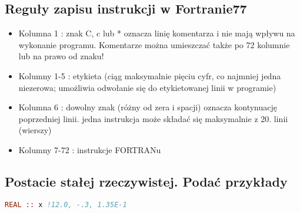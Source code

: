 \subsection{Reguły zapisu instrukcji w Fortranie77}
\begin{itemize}
\item Kolumna 1 : znak C, c lub * oznacza linię komentarza i nie mają
wpływu na wykonanie programu. Komentarze można
umieszczać także po 72 kolumnie lub na prawo od znaku!
\item Kolumny 1-5 : etykieta (ciąg maksymalnie pięciu cyfr, co najmniej
jedna niezerowa; umożliwia odwołanie się do etykietowanej
linii w programie)
\item Kolumna 6 : dowolny znak (różny od zera i spacji) oznacza
kontynuację poprzedniej linii. jedna instrukcja może składać
się maksymalnie z 20. linii (wierszy)
\item Kolumny 7-72 : instrukcje FORTRANu
\end{itemize}

\subsection{Postacie stałej rzeczywistej. Podać przykłady}
\begin{lstlisting}[language=Fortran, caption=dyrektywa implicit]
REAL :: x !12.0, -.3, 1.35E-1
\end{lstlisting}
